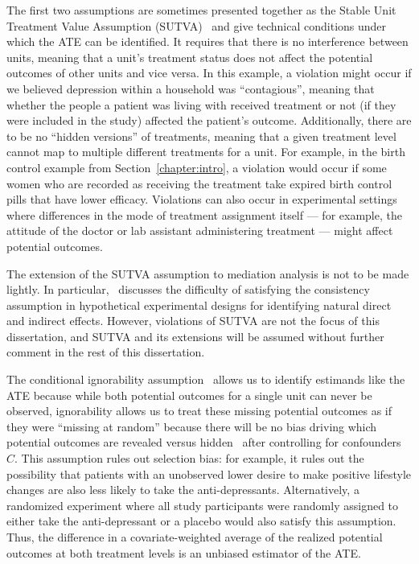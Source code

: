 The first two assumptions are sometimes presented together as the Stable Unit Treatment Value Assumption 
(SUTVA)~\citep{rubin1980a} and give technical conditions under which
the ATE can be identified. It requires that there is no interference between units, meaning that a unit's 
treatment status does not affect the potential outcomes of other units and vice versa. In this example, a violation
might occur if we believed depression within a household was ``contagious'', meaning that whether the people a patient
was living with received treatment or not (if they were included in the study) affected the patient's outcome.  
Additionally, there are to be no ``hidden versions'' of treatments, meaning that a given treatment 
level cannot map to multiple different treatments for a unit. For example, in the birth control example from 
Section~\ref{chapter:intro}, a violation would occur if some women who are recorded as receiving the treatment take
expired birth control pills that have lower efficacy. Violations can also occur in experimental settings where differences
in the mode of treatment assignment itself --- for example, the attitude of the doctor or lab assistant administering 
treatment --- might affect potential outcomes.

The extension of the SUTVA assumption to mediation analysis is not to be made lightly. In particular,~\cite{imaietal2013} 
discusses the difficulty of satisfying the consistency assumption in hypothetical 
experimental designs for identifying natural direct and indirect effects. However, violations of SUTVA are not 
the focus of this dissertation, and SUTVA and its extensions will be assumed without further comment 
in the rest of this dissertation. 

The conditional ignorability assumption~\citep{rubin1978} allows us to identify estimands like the ATE because while both 
potential outcomes for a single unit can never be observed, ignorability allows us to treat these missing potential 
outcomes as if they were ``missing at random'' because there will be no bias driving which potential outcomes are revealed
versus hidden~\citep{imbens2015} after controlling for confounders $C$. This assumption
rules out selection bias: for example, it rules out the possibility that patients with an unobserved lower desire to 
make positive lifestyle changes are also less likely to take the anti-depressants. Alternatively, a randomized experiment
where all study participants were randomly assigned to either take the anti-depressant or a placebo would also satisfy 
this assumption. Thus, the difference in a covariate-weighted average of the realized potential outcomes at both
treatment levels is an unbiased estimator of the ATE.

